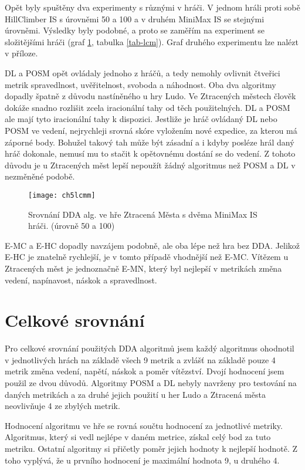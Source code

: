 Opět byly spuštěny dva experimenty s různými v hráči. V jednom hráli proti sobě HillClimber IS s úrovněmi 50 a 100 a v druhém MiniMax IS se stejnými úrovněmi. Výsledky byly podobné, a proto se zaměřím na experiment se složitějšími hráči (graf \ref{fig-ch5lcmm}, tabulka \ref{tab-lcm}). Graf druhého experimentu lze nalézt v příloze.

DL a POSM opět ovládaly jednoho z hráčů, a tedy nemohly ovlivnit čtveřici metrik spravedlnost, uvěřitelnost, svoboda a náhodnost. Oba dva algoritmy dopadly špatně z důvodu nastíněného u hry Ludo. Ve Ztracených městech člověk dokáže snadno rozlišit zcela iracionální tahy od těch použitelných. DL a POSM ale mají tyto iracionální tahy k dispozici. Jestliže je hráč ovládaný DL nebo POSM ve vedení, nejrychleji srovná skóre vyložením nové expedice, za kterou má záporné body. Bohužel takový tah může být zásadní a i kdyby posléze hrál daný hráč dokonale, nemusí mu to stačit k opětovnému dostání se do vedení. Z tohoto důvodu je u Ztracených měst lepší nepoužít žádný algoritmus než POSM a DL v nezměněné podobě.

\begin{figure}
  \centering
  \texttt{[image: ch5lcmm]}
	\caption{Srovnání DDA alg. ve hře Ztracená Města s dvěma MiniMax IS hráči. (úrovně 50 a 100)}
	\label{fig-ch5lcmm}
\end{figure}

E-MC a E-HC dopadly navzájem podobně, ale oba lépe než hra bez DDA. Jelikož E-HC je znatelně rychlejší, je v tomto případě vhodnější než E-MC. Vítězem u Ztracených měst je jednoznačně E-MN, který byl nejlepší v metrikách změna vedení, napínavost, náskok a spravedlnost.

\section{Celkové srovnání}

Pro celkové srovnání použitých DDA algoritmů jsem každý algoritmus ohodnotil v jednotlivých hrách na základě všech 9 metrik a zvlášť na základě pouze 4 metrik změna vedení, napětí, náskok a poměr vítězství. Dvojí hodnocení jsem použil ze dvou důvodů. Algoritmy POSM a DL nebyly navrženy pro testování na daných metrikách a za druhé jejich použití u her Ludo a Ztracená města neovlivňuje 4 ze zbylých metrik.

Hodnocení algoritmu ve hře se rovná součtu hodnocení za jednotlivé metriky. Algoritmus, který si vedl nejlépe v daném metrice, získal celý bod za tuto metriku. Ostatní algoritmy si přičetly poměr jejich hodnoty k nejlepší hodnotě. Z toho vyplývá, že u prvního hodnocení je maximální hodnota 9, u druhého 4.

